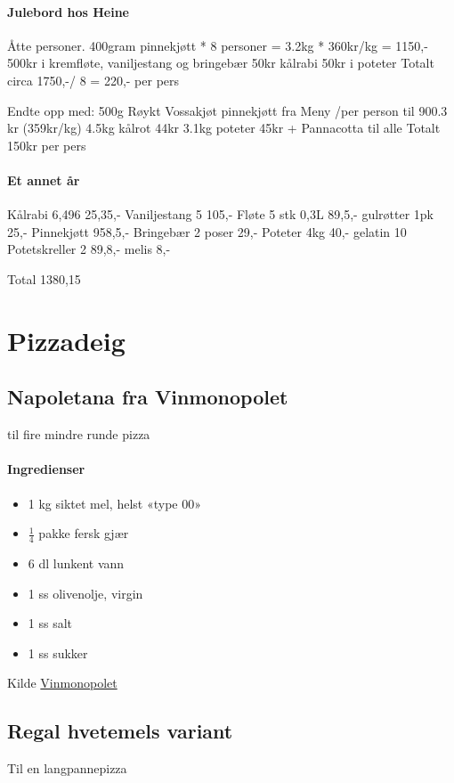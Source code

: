 \documentclass[12pt,a4paper]{book}
\begin{document}
{\paragraph{Julebord hos Heine}
Åtte personer.
400gram pinnekjøtt * 8 personer = 3.2kg * 360kr/kg = 1150,-
500kr i kremfløte, vaniljestang og bringebær
50kr kålrabi
50kr i poteter
Totalt circa 1750,-/ 8 = 220,- per pers


Endte opp med:
500g Røykt Vossakjøt pinnekjøtt fra Meny /per person til 900.3 kr (359kr/kg)
4.5kg kålrot 44kr
3.1kg poteter 45kr
+ Pannacotta til alle
Totalt 150kr per pers


\paragraph{Et annet år}

Kålrabi 6,496 25,35,-
Vaniljestang 5 105,-
Fløte 5 stk 0,3L 89,5,-
gulrøtter 1pk 25,-
Pinnekjøtt 958,5,-
Bringebær 2 poser 29,-
Poteter 4kg 40,-
gelatin 10
Potetskreller 2 89,8,-
melis 8,-


Total
1380,15
\clearpage{}
\clearpage{}\section{﻿Pizzadeig}

\subsection{Napoletana fra Vinmonopolet}
til fire mindre runde pizza
\paragraph{Ingredienser}
\begin{itemize}[noitemsep]
	\item 1 kg siktet mel, helst «type 00»
	\item $\frac{1}{4}$  pakke fersk gjær
	\item 6 dl lunkent vann
	\item 1 ss olivenolje, virgin
	\item 1 ss salt
	\item 1 ss sukker
\end{itemize}


Kilde \href{http://www.vinmonopolet.no/artikkel/mat-og-drikke/kombinasjoner-med-mat/pizza/drikke-til-pizza}{Vinmonopolet}


\subsection{Regal hvetemels variant}
Til en langpannepizza

}
\end{document}
